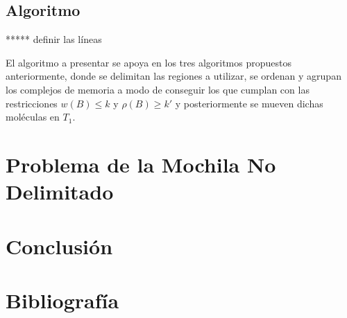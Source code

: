 \documentclass[12pt, letterpaper, twoside]{article}
\begin{document}
    \subsection{Algoritmo}
    ***** definir las líneas
    \par El algoritmo a presentar se apoya en los tres algoritmos propuestos anteriormente, donde se delimitan las regiones a utilizar, se ordenan y agrupan los complejos de memoria a modo de conseguir los que cumplan con las restricciones $w(B)\leq k$ y $\rho(B)\geq k'$ y posteriormente se mueven dichas moléculas en $T_1$.
    \begin{algorithm}
        \caption{}
        \label{BoundedKnapsack}
        \begin{algorithmic}[1]
            \EndFor
            \EndFor
            \EndProcedure
        \end{algorithmic}
    \end{algorithm}
    \section{Problema de la Mochila No Delimitado}
    \section{Conclusión}

    \section{Bibliografía}
    \newpage
    \printbibliography
\end{document}
